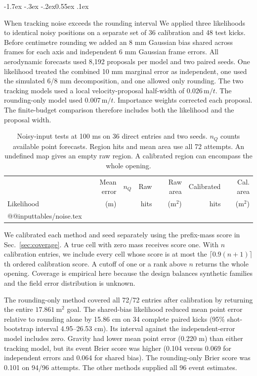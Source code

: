 \documentclass[11pt,letterpaper]{article}
\makeatletter
\renewcommand{\subsection}{\reserveheadroom\@startsection{subsection}{2}{\z@}
  {-1.7ex \@plus -.3ex \@minus -.2ex}{0.55ex \@plus .1ex}
  {\normalfont\normalsize\sffamily\bfseries\color{black}\raggedright}}
\newcommand{\reserveheadroom}{\par\ifdim\dimexpr\pagegoal-\pagetotal\relax<5\baselineskip\newpage\fi}
\makeatother
\begin{document}
\subsection{When tracking noise exceeds the rounding interval}
We applied three likelihoods to identical noisy positions on a separate set of 36 calibration and 48 test kicks. Before centimetre rounding we added an 8 mm Gaussian bias shared across frames for each axis and independent 6 mm Gaussian frame errors. All aerodynamic forecasts used 8,192 proposals per model and two paired seeds. One likelihood treated the combined 10 mm marginal error as independent, one used the simulated 6/8 mm decomposition, and one allowed only rounding. The two tracking models used a local velocity-proposal half-width of \(0.026\,\mathrm{m}/t\). The rounding-only model used \(0.007\,\mathrm{m}/t\). Importance weights corrected each proposal. The finite-budget comparison therefore includes both the likelihood and the proposal width.

\begin{table}[htbp]\centering\small
\caption{Noisy-input tests at 100 ms on 36 direct entries and two seeds. \(n_Q\) counts available point forecasts. Region hits and mean area use all 72 attempts. An undefined map gives an empty raw region. A calibrated region can encompass the whole opening.}
\label{tab:noise}\setlength{\tabcolsep}{4pt}
\begin{tabular}{@{}lrrrrrr@{}}\toprule
 & Mean error & $n_Q$ & Raw & Raw area & Calibrated & Cal. area\\
Likelihood & (m) & & hits & (m\(^2\)) & hits & (m\(^2\))\\\midrule
\csname @@input\endcsname tables/noise.tex
\bottomrule\end{tabular}\end{table}

We calibrated each method and seed separately using the prefix-mass score in Sec.~\ref{sec:coverage}. A true cell with zero mass receives score one. With \(n\) calibration entries, we include every cell whose score is at most the \(\lceil0.9(n+1)\rceil\)th ordered calibration score. A cutoff of one or a rank above \(n\) returns the whole opening. Coverage is empirical here because the design balances synthetic families and the field error distribution is unknown.

The rounding-only method covered all 72/72 entries after calibration by returning the entire \(17.861\ \mathrm{m^2}\) goal. The shared-bias likelihood reduced mean point error relative to rounding alone by 15.86 cm on 34 complete paired kicks (95\% shot-bootstrap interval 4.95--26.53 cm). Its interval against the independent-error model includes zero. Gravity had lower mean point error (0.220 m) than either tracking model, but its event Brier score was higher (0.104 versus 0.069 for independent errors and 0.064 for shared bias). The rounding-only Brier score was 0.101 on 94/96 attempts. The other methods supplied all 96 event estimates.
\end{document}
